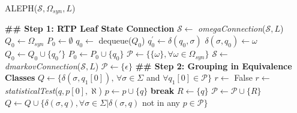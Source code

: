 {%
%
\begin{algorithm}
  \caption{ALEPH($\mathcal{S}, \Omega_{syn}, L$)\label{alg:aleph}}
    \begin{algorithmic}[1]
      \Procedure{}{}
      	\State \textbf{\#\# Step 1: RTP Leaf State Connection}
      		\State $\mathcal{S} \gets$ \textit{omegaConnection}($\mathcal{S}, L$)
	      	\State $Q_0 \gets \Omega_{syn}$
	      	\State $P_0 \gets \emptyset$
	      		\State $q_0 \gets$ dequeue($Q_0$)
	      		\For{$\sigma \in \Sigma$}
	      			\State $q_0^{\prime} \gets \delta(q_0,\sigma)$
	      				\State $\delta(\sigma,q_0) \gets \omega$
	      			\Else
	      					\State $Q_0 \gets Q_0\cup\{q_0'\}$
	      				\EndIf 
	      			\EndIf
	      			\State $P_0 \gets P_0\cup\{q_0\}$
	      		\EndFor
	      	\EndWhile	      	
      		\State $\mathcal{P} \gets \{\{\omega\}, \forall \omega \in \Omega_{syn}\}$
      	\Else
      		\State $\mathcal{S} \gets$ \textit{dmarkovConnection}($\mathcal{S}, L$)
      		\State $\mathcal{P} \gets \{\epsilon\}$
      	\EndIf
      	\State \textbf{\#\# Step 2: Grouping in Equivalence Classes}
      	\State $Q \gets \{\delta(\sigma, q_1[0]), \, \forall \sigma \in \Sigma$ and $\forall q_1[0]\in \mathcal{P}\}$
      		\State $r \gets$ False
      			\State $r \gets$ \textit{statisticalTest}($q, p[0], \aleph$)
      				\State $p \gets p\cup\{q\}$
      				\State \textbf{break}
      			\EndIf
      		\EndFor
      			\State $R \gets \{q\}$
      			\State $\mathcal{P} \gets \mathcal{P}\cup\{R\}$
      		\EndIf 
      		\State $Q \gets Q\cup\{\delta(\sigma,q),\forall \sigma\in\Sigma|\delta(\sigma,q)$ not in any $p\in\mathcal{P}\}$

\end{algorithmic}
\end{algorithm}}
